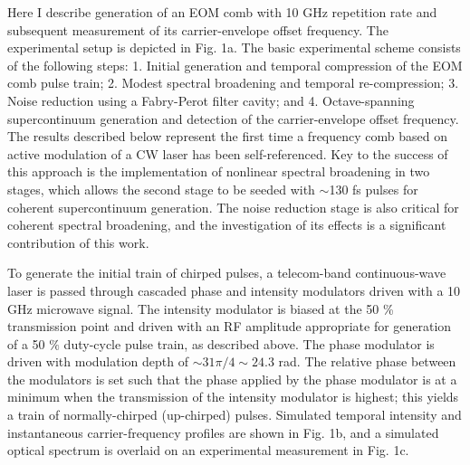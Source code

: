 Here I describe generation of an EOM comb with 10 GHz repetition rate and subsequent measurement of its carrier-envelope offset frequency. The experimental setup is depicted in Fig. 1a. The basic experimental scheme consists of the following steps: 1. Initial generation and temporal compression of the EOM comb pulse train; 2. Modest spectral broadening and temporal re-compression; 3. Noise reduction using a Fabry-Perot filter cavity; and 4. Octave-spanning supercontinuum generation and detection of the carrier-envelope offset frequency. The results described below represent the first time a frequency comb based on active modulation of a CW laser has been self-referenced. Key to the success of this approach is the implementation of nonlinear spectral broadening in two stages, which allows the second stage to be seeded with $\sim$130 fs pulses for coherent supercontinuum generation. The noise reduction stage is also critical for coherent spectral broadening, and the investigation of its effects is a significant contribution of this work. 

To generate the initial train of chirped pulses, a telecom-band continuous-wave laser is passed through cascaded phase and intensity modulators driven with a 10 GHz microwave signal. The intensity modulator is biased at the 50 \% transmission point and driven with an RF amplitude appropriate for generation of a 50 $\%$ duty-cycle pulse train, as described above.   The phase modulator is driven with modulation depth of $\sim31\pi/4\sim24.3$ rad. The relative phase between the modulators is set such that the phase applied by the phase modulator is at a minimum when the transmission of the intensity modulator is highest; this yields a train of normally-chirped (up-chirped) pulses. Simulated temporal intensity and instantaneous carrier-frequency profiles are shown in Fig. 1b, and a simulated optical spectrum is overlaid on an experimental measurement in Fig. 1c.


